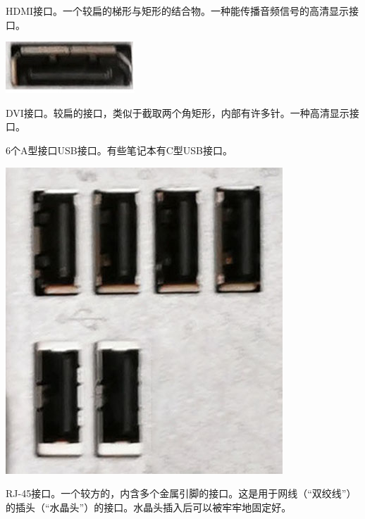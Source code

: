 HDMI接口。一个较扁的梯形与矩形的结合物。一种能传播音频信号的高清显示接口。
\begin{center}
	\includegraphics{pic/HDMI}
\end{center}\par
DVI接口。较扁的接口，类似于截取两个角矩形，内部有许多针。一种高清显示接口。\par
6个A型接口USB接口。有些笔记本有C型USB接口。
\begin{center}
	\includegraphics[width=0.7\linewidth]{pic/USB}
\end{center}\par
RJ-45接口。一个较方的，内含多个金属引脚的接口。这是用于网线（“双绞线”）的插头（“水晶头”）的接口。水晶头插入后可以被牢牢地固定好。
